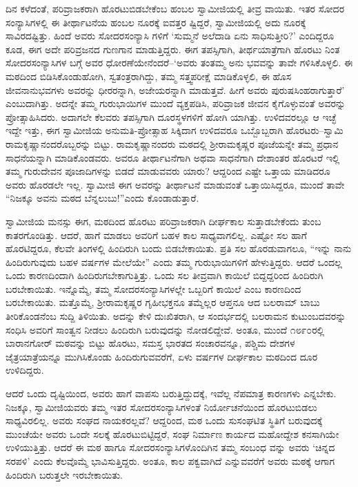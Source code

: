 ದಿನ ಕಳೆದಂತೆ, ಪರಿವ್ರಾಜಕರಾಗಿ ಹೊರಟುಬಿಡಬೇಕೆಂಬ ಹಂಬಲ ಸ್ವಾಮೀಜಿಯಲ್ಲಿ ತೀವ್ರ ವಾಯಿತು. ಇತರ ಸೋದರ ಸಂನ್ಯಾಸಿಗಳಲ್ಲಿ ಈ ತೀರ್ಥಾಟನೆಯ ಹಂಬಲ ನೂರಕ್ಕೆ ಐವತ್ತರ ಷ್ಟಿದ್ದರೆ, ಸ್ವಾಮೀಜಿಯಲ್ಲಿ ಅದು ನೂರಕ್ಕೆ ಸಾವಿರದಷ್ಟಿತ್ತು. ಹಿಂದೆ ಅವರು ಸೋದರಸಂನ್ಯಾಸಿ ಗಳಿಗೆ ‘ಸುಮ್ಮನೆ ಅಲೆದಾಡಿ ಏನು ಸಾಧಿಸುತ್ತೀರಿ?’ ಎಂದಿದ್ದರೂ ಕೂಡ, ಈಗ ಅದೇ ಪರಿವ್ರಜನದ ಗುಣಗಾನ ಮಾಡುತ್ತಿದ್ದರು. ಈಗ ತಪಸ್ಸಿಗಾಗಿ, ತೀರ್ಥಯಾತ್ರೆಗಾಗಿ ಹೊರಟು ನಿಂತ ಸೋದರಸಂನ್ಯಾಸಿಗಳ ಬಗ್ಗೆ ಅವರ ಧೋರಣೆಯೇನೆಂದರೆ–‘ಅವರು ತಂತಮ್ಮ ಅನು ಭವವನ್ನು ತಾವೇ ಗಳಿಸಿಕೊಳ್ಳಲಿ. ಈ ಮಠದಿಂದ ಬಿಡಿಸಿಕೊಂಡುಹೋಗಿ, ಸ್ವತಂತ್ರರಾಗಿದ್ದು, ತಮ್ಮ ಸತ್ತ್ವಪರೀಕ್ಷೆ ಮಾಡಿಕೊಳ್ಳಲಿ, ಈ ಹೊಸ ಜೀವನಾನುಭವಗಳು ಅವರನ್ನು ಧೀರರನ್ನಾಗಿ, ಅಜೇಯರನ್ನಾಗಿ ಮಾಡುತ್ತವೆ. ಹೀಗೆ ಅವರು ಪುರುಷಸಿಂಹರಾಗುತ್ತಾರೆ’ ಎಂಬುದಾಗಿತ್ತು. ಅದನ್ನೇ ತಮ್ಮ ಗುರುಭಾಯಿಗಳ ಮುಂದೆ ವ್ಯಕ್ತಪಡಿಸಿ, ಪರಿವ್ರಾಜಕ ಜೀವನ ಕೈಗೊಳ್ಳುವಂತೆ ಅವರನ್ನು ಪ್ರೋತ್ಸಾಹಿಸಿದರು. ಅದಾಗಲೇ ಕೆಲವರು ತಪಸ್ಸಿಗಾಗಿ ದೂರಸ್ಥಳಗಳಿಗೆ ಹೋಗಿ ಯಾಗಿತ್ತು. ಉಳಿದವರಲ್ಲೂ ಆ ಇಚ್ಛೆ ಇದ್ದೇ ಇತ್ತು, ಈಗ ಸ್ವಾಮೀಜಿಯ ಅನುಮತಿ-ಪ್ರೋತ್ಸಾಹ ಸಿಕ್ಕಿದಾಗ ಉಳಿದವರೂ ಒಬ್ಬೊಬ್ಬರಾಗಿ ಹೊರಟರು–ಸ್ವಾಮಿ ರಾಮಕೃಷ್ಣಾನಂದರೊಬ್ಬರನ್ನು ಬಿಟ್ಟು. ರಾಮಕೃಷ್ಣಾನಂದರು ಮಠದಲ್ಲಿ ಶ್ರೀರಾಮಕೃಷ್ಣರ ಪೂಜೆಯನ್ನೇ ತಮ್ಮ ಪ್ರಧಾನ ಸಾಧನೆಯನ್ನಾಗಿ ಮಾಡಿಕೊಂಡವರು. ಅವರೂ ತೀರ್ಥಾಟನೆಗಾಗಿ ಅಥವಾ ಸಾಧನೆಗಾಗಿ ದೇಶಾಂತರ ಹೊರಟರೆ ಇಲ್ಲಿ ತಮ್ಮ ಗುರುದೇವನ ಪೂಜಾದಿಗಳನ್ನು ಬಿಡದೆ ಮಾಡುವವರು ಯಾರು? ಆದ್ದರಿಂದ ಎಷ್ಟೇ ಒತ್ತಾಯ ಮಾಡಿದರೂ ಅವರು ಹೊರಡಲೇ ಇಲ್ಲ. ಸ್ವಾಮೀಜಿ ಈಗ ಅವರನ್ನು ತೀರ್ಥಾಟನೆ ಮಾಡುವಂತೆ ಒತ್ತಾಯಿಸಿದ್ದರೂ, ಮುಂದೆ ತಾವೇ “ನಿಜಕ್ಕೂ ಅವನು ಮಠದ ಬೆನ್ನಲುಬು!”ಎಂದು ಕೊಂಡಾಡುತ್ತಾರೆ.

ಸ್ವಾಮೀಜಿಯ ಮನಸ್ಸು ಈಗ, ಮಠದಿಂದ ಹೊರಟು ಪರಿವ್ರಾಜಕರಾಗಿ ದೀರ್ಘಕಾಲ ಸುತ್ತಾಡಬೇಕೆಂದು ತುಂಬ ಕಾತರಗೊಂಡಿತ್ತು. ಆದರೆ, ಹಾಗೆ ಮಾಡಲು ಅವರಿಗೆ ಬಹಳ ಕಾಲ ಸಾಧ್ಯವಾಗಲಿಲ್ಲ. ಎಷ್ಟೋ ಸಲ ಹಾಗೆ ಹೊರಟಿದ್ದರೂ, ಕೆಲವೇ ತಿಂಗಳಲ್ಲಿ ಹಿಂದಿರುಗಿ ಬಂದು ಬಿಡಬೇಕಾಯಿತು. ಪ್ರತಿ ಸಲ ಹೊರಡುವಾಗಲೂ, “ಇನ್ನು ನಾನು ಹಿಂದಿರುಗುವುದು ಬಹಳ ವರ್ಷಗಳ ಮೇಲೆಯೇ” ಎಂದು ತಮ್ಮ ಗುರುಭಾಯಿಗಳಿಗೆ ಹೇಳುತ್ತಿದ್ದರು. ಆದರೆ ಒಂದಲ್ಲ ಒಂದು ಕಾರಣದಿಂದಾಗಿ ಹಿಂದಿರುಗಬೇಕಾಗುತ್ತಿತ್ತು. ಒಂದು ಸಲ ತೀವ್ರವಾಗಿ ಕಾಯಿಲೆ ಬಿದ್ದದ್ದರಿಂದ ಹಿಂದಿರುಗಿ ಬರಬೇಕಾಯಿತು. ಇನ್ನೊಮ್ಮೆ, ತಮ್ಮ ಸೋದರಸಂನ್ಯಾಸಿಗಳಲ್ಲೇ ಒಬ್ಬರಿಗೆ ಕಾಯಿಲೆ ಎಂಬ ಕಾರಣದಿಂದ ಬರಬೇಕಾಯಿತು. ಮತ್ತೊಮ್ಮೆ, ಶ್ರೀರಾಮಕೃಷ್ಣರ ಗೃಹೀಭಕ್ತನೂ ತಮ್ಮೆಲ್ಲರ ಆಪ್ತನೂ ಆದ ಬಲರಾಮ್ ಬಾಬು ತೀರಿಕೊಂಡನೆಂಬ ಸುದ್ದಿ ತಿಳಿಯಿತು. ಅದನ್ನು ಕೇಳಿ ದುಃಖಿತರಾಗಿ, ಆ ಸಂದರ್ಭದಲ್ಲಿ ಬಲರಾಮನ ಕುಟುಂಬದವರನ್ನು ಸಂಧಿಸಿ ಅವರಿಗೆ ಸಾಂತ್ವನ ನೀಡಲು ಹಿಂದಿರುಗಿ ಬರುವುದನ್ನು ನೋಡಲಿದ್ದೇವೆ. ಅಂತೂ, ಮುಂದೆ ೧೮೯೦ರಲ್ಲಿ ಬಾರಾನಗೋರ್ ಮಠವನ್ನು ಬಿಟ್ಟು ಹೊರಟು, ಸಮಸ್ತ ಭಾರತದ ಸಂಚಾರವನ್ನೂ, ಪಶ್ಚಿಮ ದೇಶಗಳ ಜೈತ್ರಯಾತ್ರೆಯನ್ನೂ ಮುಗಿಸಿಕೊಂಡು ಹಿಂದಿರುಗುವವರೆಗೆ, ಏಳು ವರ್ಷಗಳ ದೀರ್ಘಕಾಲ ಮಠದಿಂದ ದೂರ ಉಳಿದಿದ್ದರು.

ಆದರೆ ಒಂದು ದೃಷ್ಟಿಯಿಂದ, ಅವರು ಹಾಗೆ ವಾಪಸು ಬರುತ್ತಿದ್ದುದಕ್ಕೆ, ಇವೆಲ್ಲ ನೆಪಮಾತ್ರ ಕಾರಣಗಳು ಎನ್ನಬೇಕು. ನಿಜಕ್ಕೂ, ಸ್ವಾಮೀಜಿಯವರು ತಮ್ಮ ಇತರ ಸೋದರಸಂನ್ಯಾಸಿಗಳಂತೆ ನಿರ್ಯೋಚನೆಯಿಂದ ಹೊರಟುಬಿಡಲು ಸಾಧ್ಯವಿರಲಿಲ್ಲ. ಅವರು ಸಂಘದ ನಾಯಕರಲ್ಲವೆ? ಆದ್ದರಿಂದ, ಮಠ ಒಂದು ಸುಸಂಘಟಿತ ಸ್ಥಿತಿಗೆ ಬರುವುದಕ್ಕೆ ಮುಂಚೆಯೇ ಅವರು ಒಂದೇ ಸಲಕ್ಕೆ ಹೊರಟುಬಿಟ್ಟಿದ್ದರೆ, ಸಂಘ ನಿರ್ಮಾಣ ಕಾರ್ಯದ ಮಹೋದ್ದೇಶ ಕನಸಾಗಿಯೇ ಉಳಿಯುತ್ತಿತ್ತು. ಆದರೆ ಈ ಮಠ ಹಾಗೂ ಸೋದರಸಂನ್ಯಾಸಿಗಳೊಂದಿಗಿನ ತಮ್ಮ ಸಂಬಂಧ ವನ್ನು ಅವರು ‘ಚಿನ್ನದ ಸರಪಳಿ’ ಎಂದು ಕೆಲವೊಮ್ಮೆ ಭಾವಿಸುತ್ತಿದ್ದರು. ಅಂತೂ, ಕಾಲ ಪಕ್ವವಾಗಿದೆ ಎನ್ನುವವರೆಗೆ ಅವರು ಮಠಕ್ಕೆ ಆಗಾಗ ಹಿಂದಿರುಗಿ ಬರುತ್ತಲೇ ಇರಬೇಕಾಯಿತು.


